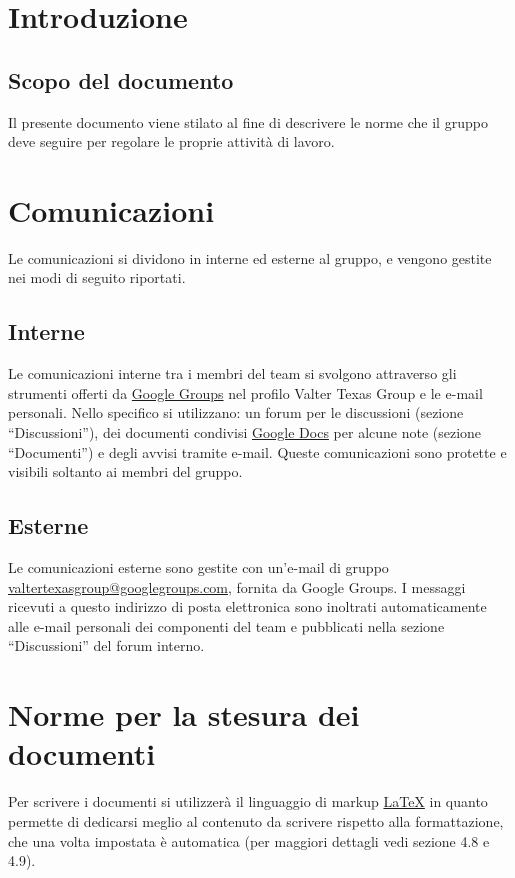 \chapter{Introduzione}
\thispagestyle{fancy} %

\section{Scopo del documento}
Il presente documento viene stilato al fine di descrivere le norme che il gruppo
deve seguire per regolare le proprie attivit\`a di lavoro.



\chapter{Comunicazioni}
\thispagestyle{fancy}
Le comunicazioni si dividono in interne ed esterne al gruppo, e vengono gestite
nei modi di seguito riportati.

\section{Interne}
Le comunicazioni interne tra i membri del team si svolgono attraverso gli
strumenti offerti da \underline{Google Groups} nel profilo Valter Texas Group e
le e-mail personali. Nello specifico si utilizzano: un forum per le discussioni
(sezione ``Discussioni''), dei documenti condivisi \underline{Google Docs} per
alcune note (sezione ``Documenti'') e degli avvisi tramite e-mail. 
Queste comunicazioni sono protette e visibili soltanto ai membri del gruppo.


\section{Esterne}
Le comunicazioni esterne sono gestite con un'e-mail di gruppo
\url{valtertexasgroup@googlegroups.com}, fornita da Google Groups. I messaggi
ricevuti a questo indirizzo di posta elettronica sono inoltrati automaticamente alle e-mail personali dei componenti del team e pubblicati nella
sezione ``Discussioni'' del forum interno.


\chapter{Norme per la stesura dei documenti}
\thispagestyle{fancy}
Per scrivere i documenti si utilizzer\`a il linguaggio di markup
\underline{LaTeX} in quanto permette di dedicarsi meglio al contenuto da
scrivere rispetto alla formattazione, che una volta impostata \`e automatica (per maggiori dettagli
vedi sezione 4.8 e 4.9).

